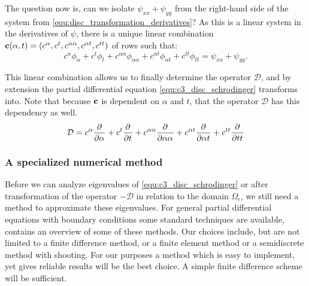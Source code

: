 The question now is, can we isolate $\psi_{xx} + \psi_{yy}$ from the right-hand side of the system from \eqref{equ:disc_transformation_derivatives}? As this is a linear system in the derivatives of $\psi$, there is a unique linear combination $\vb{c}(\alpha, t) = (c^\alpha, c^t, c^{\alpha\alpha}, c^{\alpha t}, c^{tt})$ of rows such that:
$$
    c^\alpha \phi_\alpha + c^t\phi_t + c^{\alpha\alpha}\phi_{\alpha\alpha} + c^{\alpha t} \phi_{\alpha t} + c^{tt} \phi_{tt} = \psi_{xx} + \psi_{yy}\text{.}
$$

This linear combination allows us to finally determine the operator $\mathcal{D}$, and by extension the partial differential equation \eqref{equ:c3_disc_schrodinger} transforms into. Note that because $\vb{c}$ is dependent on $\alpha$ and $t$, that the operator $\mathcal{D}$ has this dependency as well.
$$
    \mathcal{D} = c^\alpha {\pdv[]{}{\alpha}} + c^t \pdv[]{}{t} + c^{\alpha\alpha} \pdv[]{}{\alpha\alpha} + c^{\alpha t} \pdv[]{}{\alpha t} + c^{tt} \pdv[]{}{tt}
$$

\subsubsection{A specialized numerical method}

Before we can analyze eigenvalues of \eqref{equ:c3_disc_schrodinger} or after transformation of the operator $-\mathcal{D}$ in relation to the domain $\Omega_\epsilon$, we still need a method to approximate these eigenvalues. For general partial differential equations with boundary conditions some standard techniques are available, \cite[Chapter~11]{heath_scientific_2018} contains an overview of some of these methods. Our choices include, but are not limited to a finite difference method, or a finite element method or a semidiscrete method with shooting. For our purposes a method which is easy to implement, yet gives reliable results will be the best choice. A simple finite difference scheme will be sufficient.

